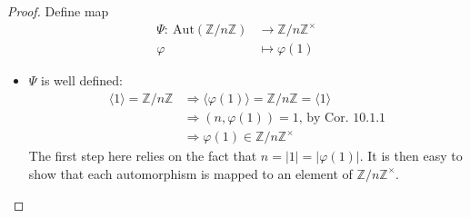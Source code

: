\documentclass{article}
\theoremstyle{definition}
\theoremstyle{remark}
\begin{document}
\begin{proof}
	Define map
	\begin{align*}
		\Psi:~\mathrm{Aut}(\mathbb{Z}/n\mathbb{Z}) & \rightarrow\mathbb{Z}/n\mathbb{Z}^{\times} \\
		\varphi                                    & \mapsto\varphi(1)
	\end{align*}
	\begin{itemize}
		\item $\Psi$ is well defined:
		      \begin{align*}
			      \langle 1 \rangle = \mathbb{Z}/n\mathbb{Z} & \Rightarrow \langle \varphi(1)\rangle = \mathbb{Z}/n\mathbb{Z}=\langle 1 \rangle \\
			                                                 & \Rightarrow (n,\varphi(1))=1 \text{, by Cor. 10.1.1}                             \\
			                                                 & \Rightarrow \varphi(1)\in\mathbb{Z}/n\mathbb{Z}^{\times}
		      \end{align*}
		      The first step here relies on the fact that $n=|1| =|\varphi(1)|$. It is then easy to show that each automorphism is mapped to an element of $\mathbb{Z}/n\mathbb{Z}^{\times}$.
	\end{itemize}
\end{proof}
\end{document}
